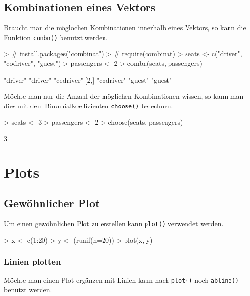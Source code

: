 \subsection{Kombinationen eines Vektors}
Braucht man die möglochen Kombinationen innerhalb eines
Vektors, so kann die Funktion \lstinline{combn()} benutzt
werden.
\begin{Schunk}
\begin{Sinput}
> # install.packages("combinat")
> # require(combinat)
> seats <- c("driver", "codriver", "guest")
> passengers <- 2
> combn(seats, passengers)
\end{Sinput}
\begin{Soutput}
     [,1]       [,2]     [,3]      
[1,] "driver"   "driver" "codriver"
[2,] "codriver" "guest"  "guest"   
\end{Soutput}
\end{Schunk}
Möchte man nur die Anzahl der möglichen Kombinationen
wissen, so kann man dies mit dem Binomialkoeffizienten
\lstinline{choose()} berechnen.
\begin{Schunk}
\begin{Sinput}
> seats <- 3
> passengers <- 2
> choose(seats, passengers)
\end{Sinput}
\begin{Soutput}
[1] 3
\end{Soutput}
\end{Schunk}

\section{Plots}\label{sec:plots}

\subsection{Gewöhnlicher Plot}
Um einen gewöhnlichen Plot zu erstellen kann \lstinline{plot()}
verwendet werden. 

\begin{Schunk}
\begin{Sinput}
> x <- c(1:20)
> y <- (runif(n=20))
> plot(x, y)
\end{Sinput}
\end{Schunk}

\subsubsection{Linien plotten}
Möchte man einen Plot ergänzen mit Linien kann nach \lstinline{plot()}
noch \lstinline{abline()} benutzt werden.

